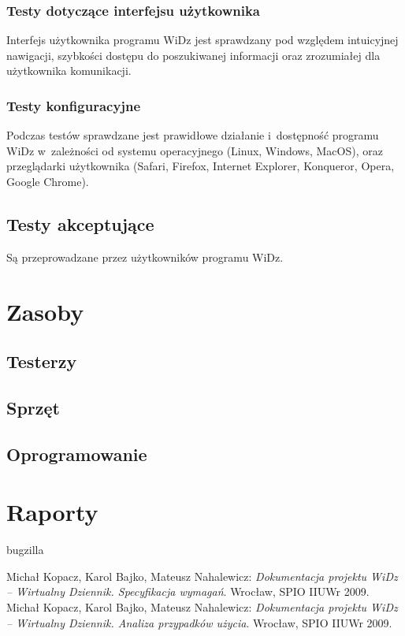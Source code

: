 \documentclass[12pt,leqno,twoside]{mwart}
\begin{document}
\subsubsection{Testy dotyczące interfejsu użytkownika}
\noindent Interfejs użytkownika programu WiDz jest sprawdzany pod względem intuicyjnej nawigacji, szybkości dostępu do poszukiwanej informacji oraz zrozumiałej dla użytkownika komunikacji. \\
\subsubsection{Testy konfiguracyjne}
\noindent Podczas testów sprawdzane jest prawidłowe działanie i~dostępność programu WiDz w~zależności od systemu operacyjnego (Linux, Windows, MacOS), oraz przeglądarki użytkownika (Safari, Firefox, Internet Explorer, Konqueror, Opera, Google Chrome).\\
\subsection{Testy akceptujące}
\noindent Są przeprowadzane przez użytkowników programu WiDz. \\
\section{Zasoby}
\subsection{Testerzy}
\subsection{Sprzęt}
\subsection{Oprogramowanie}
\section{Raporty}
bugzilla
\begin{thebibliography}{9}
	 Michał Kopacz, Karol Bajko, Mateusz Nahalewicz: {\it Dokumentacja projektu WiDz -- Wirtualny Dziennik. Specyfikacja wymagań}. Wrocław, SPIO IIUWr 2009.
	 Michał Kopacz, Karol Bajko, Mateusz Nahalewicz: {\it Dokumentacja projektu WiDz -- Wirtualny Dziennik. Analiza przypadków użycia}. Wrocław, SPIO IIUWr 2009.
\end{thebibliography}
\end{document}
